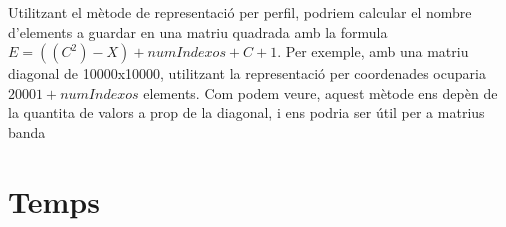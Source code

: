 \documentclass[11pt,a4paper,twoside]{report}
\begin{document}
Utilitzant el mètode de representació per perfil, podriem calcular el nombre d'elements a guardar en una matriu quadrada  amb la formula $E=((C^2)-X)+numIndexos+C+1$.
Per exemple, amb una matriu diagonal de 10000x10000, utilitzant la representació per coordenades ocuparia $20001+numIndexos$ elements. Com podem veure, aquest mètode ens depèn de la quantita de valors a prop de la diagonal, i ens podria ser útil per a matrius banda

\section{Temps}



\end{document}
